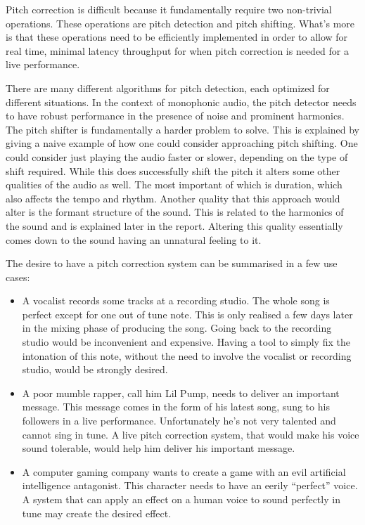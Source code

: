Pitch correction is difficult because it fundamentally require two non-trivial
operations. These operations are pitch detection and pitch shifting. What's more
is that these operations need to be efficiently implemented in order to allow for
real time, minimal latency throughput for when pitch correction is needed for a
live performance.

There are many different algorithms for pitch detection, each optimized for
different situations. In the context of monophonic audio, the pitch detector needs
to have robust performance in the presence of noise and prominent harmonics. The
pitch shifter is fundamentally a harder problem to solve. This is explained by
giving a naive example of how one could consider approaching pitch shifting.  One
could consider just playing the audio faster or slower, depending on the type of
shift required. While this does successfully shift the pitch it alters some other
qualities of the audio as well. The most important of which is duration, which
also affects the tempo and rhythm. Another quality that this approach would alter
is the formant structure of the sound. This is related to the harmonics of the
sound and is explained later in the report. Altering this quality essentially
comes down to the sound having an unnatural feeling to it.

\vspace{4mm}\noindent
The desire to have a pitch correction system can be summarised in a few use cases:
\begin{itemize}
\item
A vocalist records some tracks at a recording studio. The whole song is perfect
except for one out of tune note. This is only realised a few days later in the
mixing phase of producing the song. Going back to the recording studio would be
inconvenient and expensive. Having a tool to simply fix the intonation of this
note, without the need to involve the vocalist or recording studio, would be
strongly desired.
\item
A poor mumble rapper, call him Lil Pump, needs to deliver an important message.
This message comes in the form of his latest song, sung to his followers in a live
performance. Unfortunately he's not very talented and cannot sing in tune. A live
pitch correction system, that would make his voice sound tolerable, would help him
deliver his important message.
\item
A computer gaming company wants to create a game with an evil artificial
intelligence antagonist. This character needs to have an eerily ``perfect'' voice.
A system that can apply an effect on a human voice to sound perfectly in tune may
create the desired effect.
\end{itemize}

